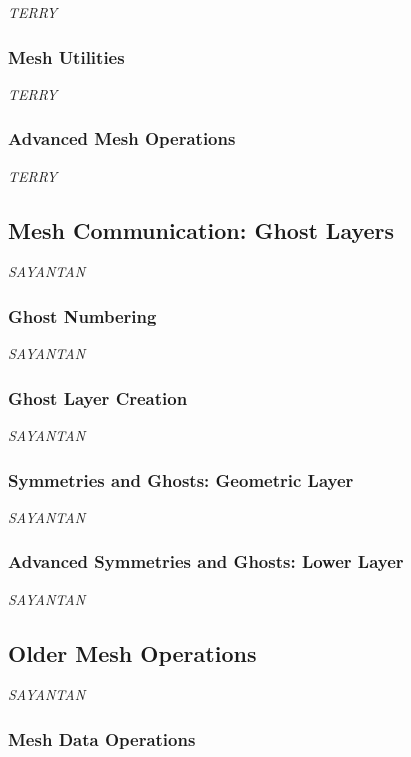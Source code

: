 {\it TERRY}

\subsubsection{Mesh Utilities}

{\it TERRY}

\subsubsection{Advanced Mesh Operations}

{\it TERRY}

\subsection{Mesh Communication: Ghost Layers}
\label{sec:ghost}

{\it SAYANTAN}

\subsubsection{Ghost Numbering}

{\it SAYANTAN}

\subsubsection{Ghost Layer Creation}

{\it SAYANTAN}

\subsubsection{Symmetries and Ghosts: Geometric Layer}

{\it SAYANTAN}

\subsubsection{Advanced Symmetries and Ghosts: Lower Layer}

{\it SAYANTAN}

\subsection{Older Mesh Operations}

{\it SAYANTAN}

\subsubsection{Mesh Data Operations}

